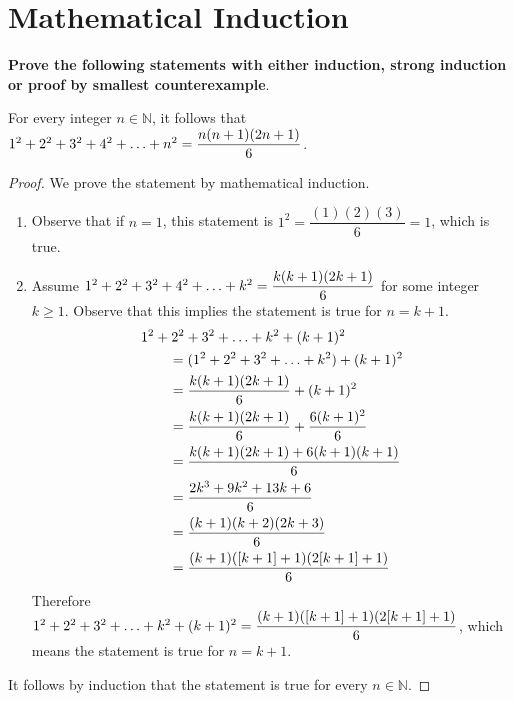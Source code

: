 \documentclass[DIN, pagenumber=false, fontsize=11pt, parskip=half]{scrartcl}
\title{}
\author{} %
\date{}
\begin{document}
\maketitle

\setcounter{section}{9}

\section{Mathematical Induction}

\textbf{Prove the following statements with either induction, strong induction or proof by smallest counterexample}.

\begin{problems}
    \problem For every integer $n \in \mathbb{N}$, it follows that
    $1^2 + 2^2 + 3^2 + 4^2 + \mathellipsis + n^2 = \dfrac{n(n+1)(2n+1)}{6}$.
    \begin{proof}
        We prove the statement by mathematical induction.

        \begin{enumerate}
            \item Observe that if $n = 1$, this statement is $1^2 = \dfrac{(1)(2)(3)}{6} = 1$, which is true.

            \item Assume $1^2 + 2^2 + 3^2 + 4^2 + \mathellipsis + k^2 = \dfrac{k(k+1)(2k+1)}{6}$ for some integer $k \geq 1$. Observe that this implies the statement is true for $n = k + 1$.
                \begin{align*}
                    \MoveEqLeft 1^2 + 2^2 + 3^2 + \mathellipsis + k^2 + (k+1)^2\\
                    & = (1^2 + 2^2 + 3^2 + \mathellipsis + k^2) + (k+1)^2\\
                    & = \dfrac{k(k+1)(2k+1)}{6} + (k+1)^2\\
                    & = \dfrac{k(k+1)(2k+1)}{6} + \dfrac{6(k+1)^2}{6}\\
                    & = \dfrac{k(k+1)(2k+1)+6(k+1)(k+1)}{6}\\
                    & = \dfrac{2k^3+9k^2+13k+6}{6}\\
                    & = \dfrac{(k+1)(k+2)(2k+3)}{6}\\
                    & = \dfrac{(k+1)([k+1] + 1)(2[k+1]+1)}{6}
                \end{align*}
                Therefore $1^2 + 2^2 + 3^2 + \mathellipsis + k^2 + (k+1)^2 = \dfrac{(k+1)([k+1] + 1)(2[k+1]+1)}{6}$, which means the statement is true for $n = k + 1$.
        \end{enumerate}
        It follows by induction that the statement is true for every $n \in \mathbb{N}$.
    \end{proof}


\end{problems}
\end{document}
